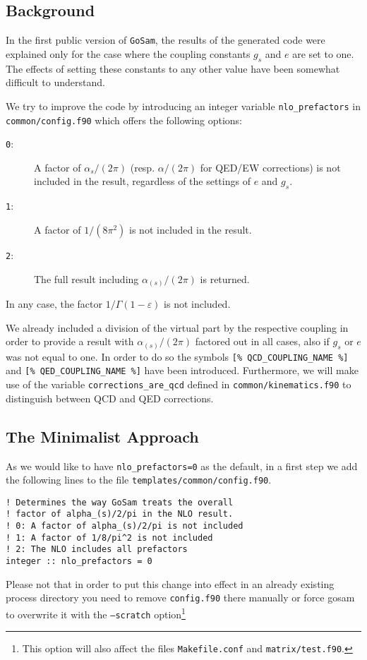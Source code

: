 \documentclass[11pt,a4paper]{refrep}
\newcommand{\golem}{{\tt GoSam}\xspace}
\begin{document}
\subsection{Background}
In the first public version of \golem{}, the results of the generated code
 were explained only for the case where the coupling constants
$g_s$ and $e$ are set to one.
The effects of setting these constants to any other value
have been somewhat difficult to understand.

We try to improve the code by introducing an integer variable
\texttt{nlo\_prefactors} in \texttt{common/config.f90} which
offers the following options:
\begin{description}
\item[\texttt{0}:] A factor of $\alpha_s/(2\pi)$ (resp. $\alpha/(2\pi)$
for QED/EW corrections) is not included in the result, regardless of the
settings of $e$ and $g_s$.
\item[\texttt{1}:] A factor of $1/(8\pi^2)$ is not included in the result.
\item[\texttt{2}:] The full result including $\alpha_{(s)}/(2\pi)$ is
returned.
\end{description}
In any case, the factor $1/\Gamma(1-\varepsilon)$ is not included.

We already included a division of the virtual part by the respective coupling
in order to provide a result with $\alpha_{(s)}/(2\pi)$ factored out in all
cases, also if $g_s$ or $e$ was not equal to one. In order to do so
the symbols \lstinline{[% QCD_COUPLING_NAME %]}
and \lstinline{[% QED_COUPLING_NAME %]}
have been introduced. Furthermore, we will make use of the
variable \texttt{corrections\_are\_qcd} defined in
\texttt{common/kinematics.f90} to distinguish between QCD and QED
corrections.

\subsection{The Minimalist Approach}
\label{ssec:nlo-prefactors:01}
As we would like to have \texttt{nlo\_prefactors=0} as the default,
in a first step we add the following lines to the file
\texttt{templates/\hspace{0pt}common/\hspace{0pt}config.f90}.
\begin{lstlisting}
! Determines the way GoSam treats the overall
! factor of alpha_(s)/2/pi in the NLO result.
! 0: A factor of alpha_(s)/2/pi is not included
! 1: A factor of 1/8/pi^2 is not included
! 2: The NLO includes all prefactors
integer :: nlo_prefactors = 0
\end{lstlisting}
\attention Please not that in order to put this change into effect in an
already existing process directory you need to remove \texttt{config.f90}
there manually or force gosam to overwrite it with the \texttt{--scratch}
option\footnote{This option will also affect the files \texttt{Makefile.conf}
and \texttt{matrix/test.f90}.}
\end{document}
